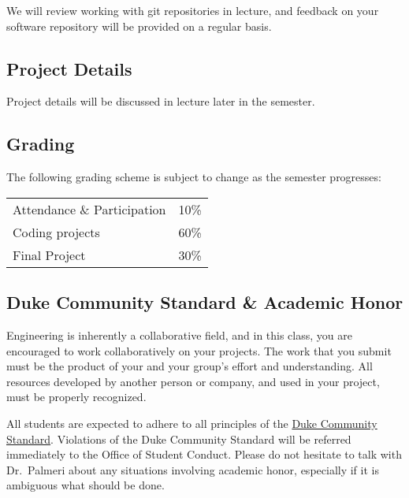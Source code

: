 We will review working with git repositories in lecture, and feedback
on your software repository will be provided on a regular basis.

\subsection*{Project Details} 
Project details will be discussed in lecture later in the semester.

\subsection*{Grading} 
The following grading scheme is subject to change as the semester progresses:

\begin{center}
\begin{tabular}{ll}
Attendance \& Participation             & 10\% \\
Coding projects                         & 60\% \\
Final Project                           & 30\% \\
\end{tabular}
\end{center}

\subsection*{Duke Community Standard \& Academic Honor} Engineering is
inherently a collaborative field, and in this class, you are encouraged to work
collaboratively on your projects.  The work that you submit must be the product
of your and your group's effort and understanding.  All resources developed by
another person or company, and used in your project, must be properly
recognized.
 
All students are expected to adhere to all principles of the
\href{http://www.integrity.duke.edu/standard.html}{Duke Community Standard}.
Violations of the Duke Community Standard will be referred immediately to the
Office of Student Conduct.  Please do not hesitate to talk with Dr.\ Palmeri
about any situations involving academic honor, especially if it is ambiguous
what should be done.


